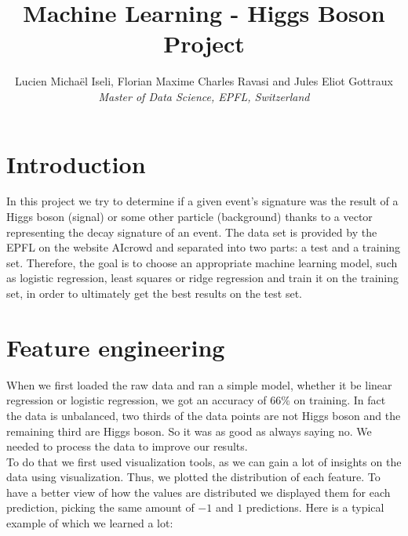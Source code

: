 \documentclass[10pt,conference,compsocconf]{IEEEtran}
\begin{document}
\title{Machine Learning - Higgs Boson Project}

\author{
  Lucien Michaël Iseli, Florian Maxime Charles Ravasi and Jules Eliot Gottraux\\
  \textit{Master of Data Science, EPFL, Switzerland}
}

\maketitle

\section{Introduction}
In this project we try to determine if a given event's signature was the result of a Higgs boson (signal) or some other particle (background) thanks to a vector representing the decay signature of an event. The data set is provided by the EPFL on the website AIcrowd and separated into two parts: a test and a training set. Therefore, the goal is to choose an appropriate machine learning model, such as logistic regression, least squares or ridge regression and train it on the training set, in order to ultimately get the best results on the test set.

\section{Feature engineering}
\label{sec:feature-engineering}
When we first loaded the raw data and ran a simple model, whether it be linear regression or logistic regression, we got an accuracy of $66\%$ on training. In fact the data is unbalanced, two thirds of the data points are not Higgs boson and the remaining third are Higgs boson. So it was as good as always saying no. We needed to process the data to improve our results. \\

To do that we first used visualization tools, as we can gain a lot of insights on the data using visualization. Thus, we plotted the distribution of each feature. To have a better view of how the values are distributed we displayed them for each prediction, picking the same amount of $-1$ and $1$ predictions. Here is a typical example of which we learned a lot:
\end{document}
